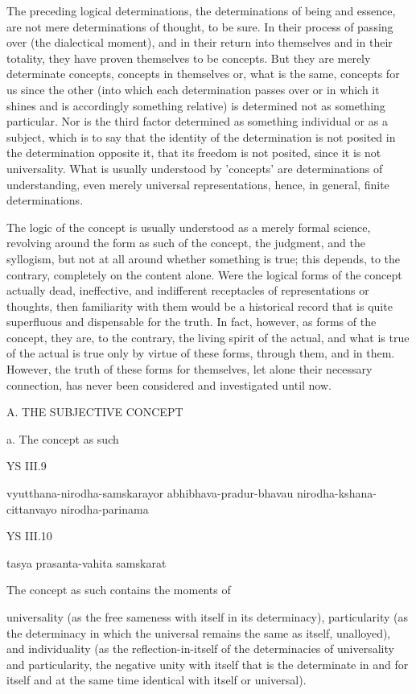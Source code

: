 The preceding logical determinations, the determinations of
being and essence, are not mere determinations of thought, to be sure.
In their process of passing over (the dialectical moment), and
in their return into themselves and in their totality,
they have proven themselves to be concepts.
But they are merely determinate concepts, concepts in themselves or,
what is the same, concepts for us since the other
(into which each determination passes over or in which it shines and
is accordingly something relative)
is determined not as something particular.
Nor is the third factor determined as something individual or as a subject,
which is to say that the identity of the determination is not posited in
the determination opposite it, that its freedom is not posited,
since it is not universality.
What is usually understood by 'concepts' are determinations of understanding,
even merely universal representations, hence, in general, finite determinations.

The logic of the concept is usually understood as a merely formal science,
revolving around the form as such of the concept, the judgment, and the syllogism,
but not at all around whether something is true;
this depends, to the contrary, completely on the content alone.
Were the logical forms of the concept actually dead, ineffective,
and  indifferent receptacles of representations or thoughts,
then familiarity with them would be a historical record that
is quite superfluous and dispensable for the truth.
In fact, however, as forms of the concept, they are, to the contrary,
the living spirit of the actual, and what is true of the actual is true
only by virtue of these forms, through them, and in them.
However, the truth of these forms for themselves,
let alone their necessary connection,
has never been considered and investigated until now.

A. THE SUBJECTIVE CONCEPT

a. The concept as such

YS III.9

vyutthana-nirodha-samskarayor abhibhava-pradur-bhavau
nirodha-kshana-cittanvayo nirodha-parinama

YS III.10

tasya prasanta-vahita samskarat

The concept as such contains the moments of

universality
(as the free sameness with itself in its determinacy),
particularity
(as the determinacy in which the universal remains the same as itself, unalloyed),
and individuality
(as the reflection-in-itself of the determinacies of universality and particularity,
the negative unity with itself that is the determinate in and for itself
and at the same time identical with itself or universal).

